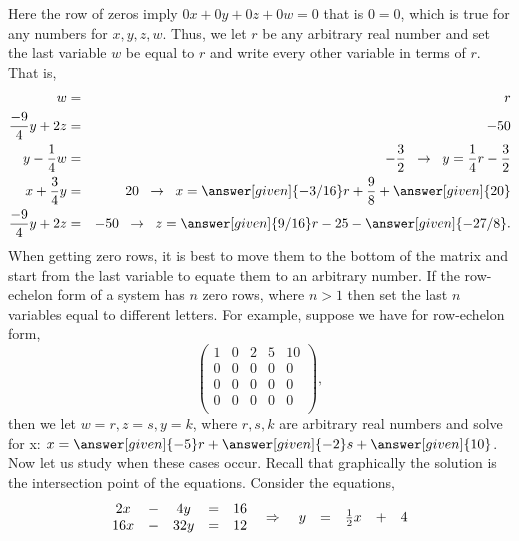 \documentclass{ximera}
\begin{document}
\begin{example}
\begin{explanation}
\[\]
Here the row of zeros imply $0x+0y+0z+0w=0$ that is $0=0$, which is true for any numbers for $x,y,z,w$. Thus, we let $r$ be any arbitrary real number and set the last variable $w$ be equal to $r$ and write every other variable in terms of $r$. That is,
\begin{eqnarray*}
w&=&r \\
\frac{-9}{4} y + 2z &=& -50\\
y- \frac{1}{4} w &=& -\frac{3}{2} \hspace{.2cm}\rightarrow \hspace{.2cm} y=\frac{1}{4} r -\frac{3}{2}\\
x +\frac{3}{4} y &=& 20 \hspace{.2cm}\rightarrow \hspace{.2cm} x = \answer[given]{-3/16} r + \frac{9}{8} + \answer[given]{20}\\
\frac{-9}{4} y + 2z &=& -50 \hspace{.2cm}\rightarrow \hspace{.2cm} z= \answer[given]{9/16} r - 25 - \answer[given]{-27/8}.
\end{eqnarray*}
When getting zero rows, it is best to move them to the bottom of the matrix and start from the last variable to equate them to an arbitrary number. If the row-echelon form of a system has $n$ zero rows, where $n>1$ then set the last $n$ variables equal to different letters. For example, suppose we have for row-echelon form,
\[
\left(\begin{array}{ccccc|c}
   1&  0 & 2 &5 &10 \\
  0&  0 & 0 &0 &0\\
  0&  0 & 0 &0 &0\\
  0&  0 & 0 &0 &0\\
\end{array}\right),
\]
then we let $w=r, z=s, y=k$, where $r,s,k$ are arbitrary real numbers and solve for x: $ x= \answer[given]{-5}r + \answer[given]{-2}s +\answer[given]{10}$. \\
Now let us study when these cases occur. Recall that graphically the solution is the intersection point of the equations. Consider the equations,
\[
\begin{array}{ccccc}
     2x& -&4y&=&16\\
     16x &-& 32y&=& 12
\end{array}
\hspace{.2cm}\Rightarrow \hspace{.2cm}
\begin{array}{ccccc}
     y&=&\frac{1}{2}x&+&4\\

\end{array}\]
\end{explanation}
\end{example}
\end{document}

